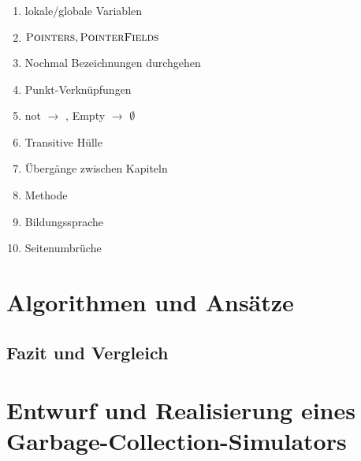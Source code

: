 
\listfiles


\listoftodos

\begin{enumerate}
	\item lokale/globale Variablen
	\item $\textsc{Pointers}, \textsc{PointerFields}$
	\item Nochmal Bezeichnungen durchgehen
	\item Punkt-Verknüpfungen
	\item not $\rightarrow$ \NOT, Empty $\rightarrow$ $\emptyset$
	\item Transitive Hülle
	\item Übergänge zwischen Kapiteln
	\item Methode
	\item Bildungssprache
	\item Seitenumbrüche
\end{enumerate}



\cleardoublepage

\setcounter{page}{1}
\pagestyle{maincontentstyle}


\part{Algorithmen und Ansätze}




\chapter{Fazit und Vergleich}		%

\part{Entwurf und Realisierung eines Garbage-Collection-Simulators}

\cleardoublepage







